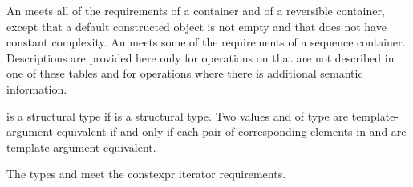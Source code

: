 \pnum
{}%
An  meets all of the requirements of a container and
of a reversible container, except that a default
constructed  object is not empty and that  does not have constant
complexity. An  meets some of the requirements of a sequence
container.
Descriptions are provided here
only for operations on  that are not described in
one of these tables and
for operations where there is additional semantic information.

\pnum
{} is a structural type if
 is a structural type.
Two values  and  of type 
are template-argument-equivalent if and only if
each pair of corresponding elements in  and 
are template-argument-equivalent.

\pnum
The types  and  meet
the constexpr iterator requirements.

